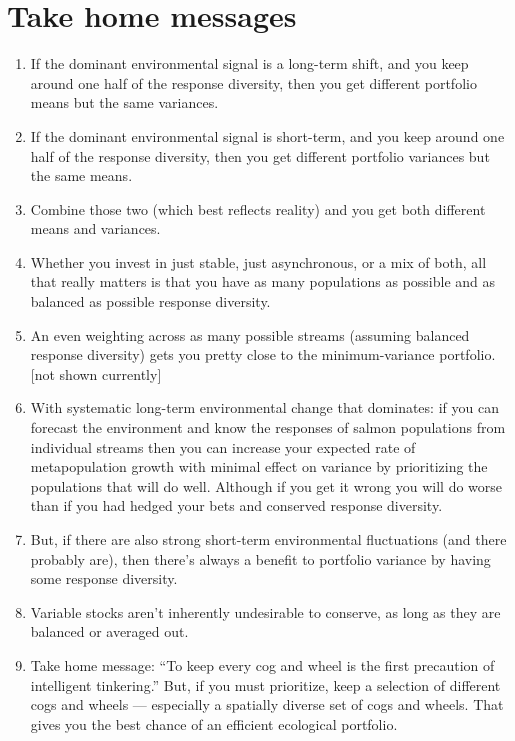 \documentclass[12pt]{article}
\begin{document}
\clearpage

\section{Take home messages}

\begin{enumerate}
\def\labelenumi{\arabic{enumi}.}
\itemsep1pt\parskip0pt
\item
  If the dominant environmental signal is a long-term shift, and you
  keep around one half of the response diversity, then you get different
  portfolio means but the same variances.
\item
  If the dominant environmental signal is short-term, and you keep
  around one half of the response diversity, then you get different
  portfolio variances but the same means.
\item
  Combine those two (which best reflects reality) and you get both
  different means and variances.
\item
  Whether you invest in just stable, just asynchronous, or a mix of
  both, all that really matters is that you have as many populations as
  possible and as balanced as possible response diversity.
\item
  An even weighting across as many possible streams (assuming balanced
  response diversity) gets you pretty close to the minimum-variance
  portfolio. {[}not shown currently{]}
\item
  With systematic long-term environmental change that dominates: if you
  can forecast the environment and know the responses of salmon
  populations from individual streams then you can increase your
  expected rate of metapopulation growth with minimal effect on variance
  by prioritizing the populations that will do well. Although if you get
  it wrong you will do worse than if you had hedged your bets and
  conserved response diversity.
\item
  But, if there are also strong short-term environmental fluctuations
  (and there probably are), then there's always a benefit to portfolio
  variance by having some response diversity.
\item
  Variable stocks aren't inherently undesirable to conserve, as long as
  they are balanced or averaged out.
\item
  Take home message: ``To keep every cog and wheel is the first
  precaution of intelligent tinkering.'' But, if you must prioritize,
  keep a selection of different cogs and wheels --- especially a
  spatially diverse set of cogs and wheels. That gives you the best
  chance of an efficient ecological portfolio.
\end{enumerate}
\end{document}
